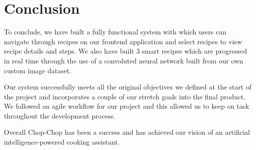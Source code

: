 \documentclass{article}
\begin{document}
\section{Conclusion}
To conclude, we have built a fully functional system with which users can
navigate through recipes on our frontend application and select recipes to view
recipe details and steps. We also have built 3 smart recipes which are
progressed in real time through the use of a convoluted neural network built
from our own custom image dataset.

Our system successfully meets all the original objectives we defined at the
start of the project and incorporates a couple of our stretch goals into the
final product. We followed an agile workflow for our project and this allowed
us to keep on task throughout the development process.

Overall Chop-Chop has been a success and has achieved our vision of an
artificial intelligence-powered cooking assistant.

\pagebreak






\end{document}
